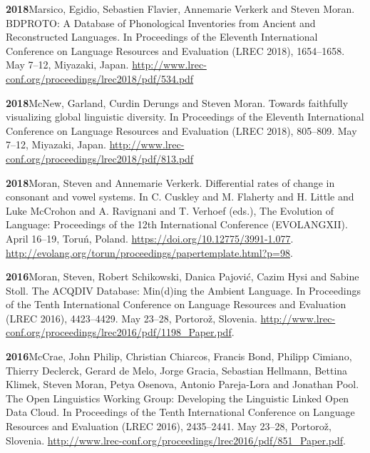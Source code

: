 \documentclass[11pt]{article}
\newcommand{\hangpara}{
 \setlength{\parindent}{0in} %
 \hangindent=0.42in %
}
\begin{document}
\vskip 6pt
\hangpara
{\bf 2018}\hspace{1ex}Marsico, Egidio, Sebastien Flavier, Annemarie Verkerk and Steven Moran. BDPROTO: A Database of Phonological Inventories from Ancient and Reconstructed Languages. In Proceedings of the Eleventh International Conference on Language Resources and Evaluation (LREC 2018), 1654--1658. May 7--12, Miyazaki, Japan. \url{http://www.lrec-conf.org/proceedings/lrec2018/pdf/534.pdf}

\vskip 6pt
\hangpara
{\bf 2018}\hspace{1ex}McNew, Garland, Curdin Derungs and Steven Moran. Towards faithfully visualizing global linguistic diversity. In Proceedings of the Eleventh International Conference on Language Resources and Evaluation (LREC 2018), 805--809. May 7--12, Miyazaki, Japan. \url{http://www.lrec-conf.org/proceedings/lrec2018/pdf/813.pdf}

\vskip 6pt
\hangpara
{\bf 2018}\hspace{1ex}Moran, Steven and Annemarie Verkerk. Differential rates of change in consonant and vowel systems. In C. Cuskley and M. Flaherty and H. Little and Luke McCrohon and A. Ravignani and T. Verhoef (eds.), The Evolution of Language: Proceedings of the 12th International Conference (EVOLANGXII). April 16--19, Toru{\'n}, Poland. \url{https://doi.org/10.12775/3991-1.077}. \url{http://evolang.org/torun/proceedings/papertemplate.html?p=98}.

\vskip 6pt
\hangpara
{\bf 2016}\hspace{1ex}Moran, Steven, Robert Schikowski, Danica Pajovi{\'c}, Cazim Hysi and Sabine Stoll. The ACQDIV Database: Min(d)ing the Ambient Language. In Proceedings of the Tenth International Conference on Language Resources and Evaluation (LREC 2016), 4423--4429. May 23--28, Portoro{\v z}, Slovenia. \url{http://www.lrec-conf.org/proceedings/lrec2016/pdf/1198\_Paper.pdf}.

\vskip 6pt
\hangpara
{\bf 2016}\hspace{1ex}McCrae, John Philip, Christian Chiarcos, Francis Bond, Philipp Cimiano, Thierry Declerck, Gerard de Melo, Jorge Gracia, Sebastian Hellmann, Bettina Klimek, Steven Moran, Petya Osenova, Antonio Pareja-Lora and Jonathan Pool. The Open Linguistics Working Group: Developing the Linguistic Linked Open Data Cloud. In Proceedings of the Tenth International Conference on Language Resources and Evaluation (LREC 2016), 2435--2441. May 23--28, Portoro{\v z}, Slovenia. \url{http://www.lrec-conf.org/proceedings/lrec2016/pdf/851\_Paper.pdf}.
\end{document}
